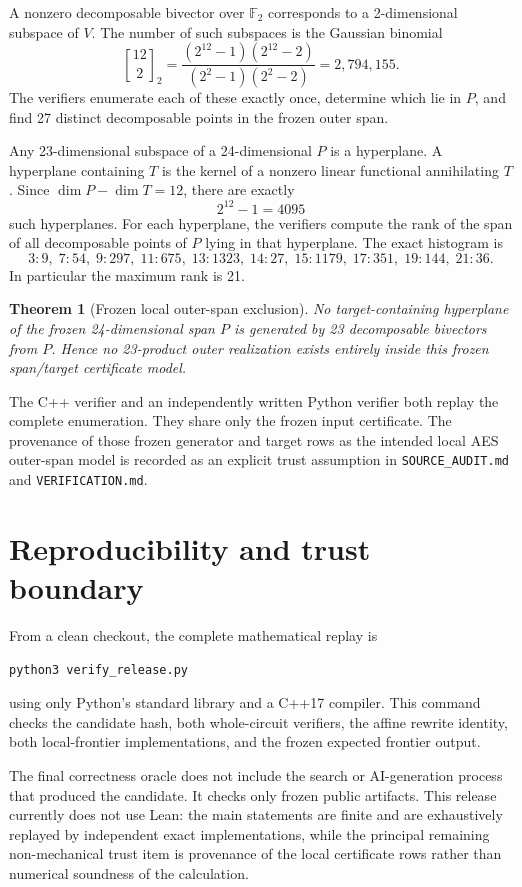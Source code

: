 \documentclass[11pt]{article}
\newcommand{\F}{\mathbb{F}}
\newtheorem{theorem}{Theorem}
\begin{document}
A nonzero decomposable bivector over \(\F_2\) corresponds to a 2-dimensional subspace of \(V\).  The number of such subspaces is the Gaussian binomial
\[
 {12\brack 2}_2=\frac{(2^{12}-1)(2^{12}-2)}{(2^2-1)(2^2-2)}=2{,}794{,}155.
\]
The verifiers enumerate each of these exactly once, determine which lie in \(P\), and find 27 distinct decomposable points in the frozen outer span.

Any 23-dimensional subspace of a 24-dimensional \(P\) is a hyperplane.  A hyperplane containing \(T\) is the kernel of a nonzero linear functional annihilating \(T\).  Since \(\dim P-\dim T=12\), there are exactly
\[
  2^{12}-1=4095
\]
such hyperplanes.  For each hyperplane, the verifiers compute the rank of the span of all decomposable points of \(P\) lying in that hyperplane.  The exact histogram is
\[
3{:}9,\;7{:}54,\;9{:}297,\;11{:}675,\;13{:}1323,\;14{:}27,\;
15{:}1179,\;17{:}351,\;19{:}144,\;21{:}36.
\]
In particular the maximum rank is 21.

\begin{theorem}[Frozen local outer-span exclusion]\label{thm:local}
No target-containing hyperplane of the frozen 24-dimensional span \(P\) is generated by 23 decomposable bivectors from \(P\).  Hence no 23-product outer realization exists entirely inside this frozen span/target certificate model.
\end{theorem}

The C++ verifier and an independently written Python verifier both replay the complete enumeration.  They share only the frozen input certificate.  The provenance of those frozen generator and target rows as the intended local AES outer-span model is recorded as an explicit trust assumption in \texttt{SOURCE\_AUDIT.md} and \texttt{VERIFICATION.md}.

\section{Reproducibility and trust boundary}
From a clean checkout, the complete mathematical replay is
\begin{verbatim}
python3 verify_release.py
\end{verbatim}
using only Python's standard library and a C++17 compiler.  This command checks the candidate hash, both whole-circuit verifiers, the affine rewrite identity, both local-frontier implementations, and the frozen expected frontier output.

The final correctness oracle does not include the search or AI-generation process that produced the candidate.  It checks only frozen public artifacts.  This release currently does not use Lean: the main statements are finite and are exhaustively replayed by independent exact implementations, while the principal remaining non-mechanical trust item is provenance of the local certificate rows rather than numerical soundness of the calculation.
\end{document}
